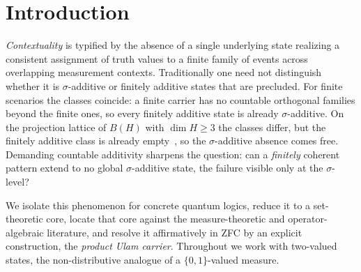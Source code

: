 \section{Introduction}

\emph{Contextuality} is typified by the absence of a single underlying state
realizing a consistent assignment of truth values to a finite family of events
across overlapping measurement contexts. Traditionally one need not
distinguish whether it is $\sigma$-additive or finitely additive states that are
precluded. For finite scenarios the classes coincide: a finite carrier has no
countable orthogonal families beyond the finite ones, so every finitely additive
state is already $\sigma$-additive. On the projection lattice of $B(H)$ with
$\dim H\geq 3$ the classes differ, but the finitely additive class is already
empty~\cite{KochenSpecker1967}, so the $\sigma$-additive absence comes free.
Demanding countable additivity sharpens the question: can a \emph{finitely}
coherent pattern extend to no global $\sigma$-additive state, the failure
visible only at the $\sigma$-level?

We isolate this phenomenon for concrete quantum logics, reduce it to a
set-theoretic core, locate that core against the measure-theoretic and
operator-algebraic literature, and resolve it affirmatively in ZFC by an
explicit construction, the \emph{product Ulam carrier}. Throughout we work
with two-valued states, the non-distributive analogue of a $\{0,1\}$-valued
measure.

